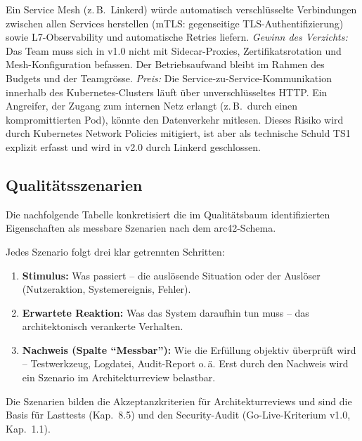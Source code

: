 \begin{description}[leftmargin=0pt, style=nextline]
  \item[Kein Service Mesh in v1.0 (ADR-007):
    $\uparrow$~Betriebseinfachheit,\;$\downarrow$~Security (kein mTLS intern)]
  Ein Service Mesh (z.\,B.\ Linkerd) würde automatisch verschlüsselte
  Verbindungen zwischen allen Services herstellen (mTLS: gegenseitige
  TLS-Authentifizierung) sowie L7-Observability und automatische Retries liefern.
  \textit{Gewinn des Verzichts:} Das Team muss sich in v1.0 nicht mit
  Sidecar-Proxies, Zertifikatsrotation und Mesh-Konfiguration befassen.
  Der Betriebsaufwand bleibt im Rahmen des Budgets und der Teamgrösse.
  \textit{Preis:} Die Service-zu-Service-Kommunikation innerhalb des
  Kubernetes-Clusters läuft über unverschlüsseltes HTTP. Ein Angreifer,
  der Zugang zum internen Netz erlangt (z.\,B.\ durch einen kompromittierten
  Pod), könnte den Datenverkehr mitlesen. Dieses Risiko wird durch
  Kubernetes Network Policies mitigiert, ist aber als technische Schuld
  TS1 explizit erfasst und wird in v2.0 durch Linkerd geschlossen.

\end{description}

\subsection{Qualitätsszenarien}

Die nachfolgende Tabelle konkretisiert die im Qualitätsbaum identifizierten
Eigenschaften als messbare Szenarien nach dem arc42-Schema.

\begin{hinweis}
  Jedes Szenario folgt drei klar getrennten Schritten:
  \begin{enumerate}[leftmargin=2em, topsep=2pt]
  \item \textbf{Stimulus:} Was passiert -- die auslösende Situation oder
  der Auslöser (Nutzeraktion, Systemereignis, Fehler).
  \item \textbf{Erwartete Reaktion:} Was das System daraufhin tun muss --
  das architektonisch verankerte Verhalten.
  \item \textbf{Nachweis (Spalte ``Messbar''):} Wie die Erfüllung
  objektiv überprüft wird -- Testwerkzeug, Logdatei,
  Audit-Report o.\,ä. Erst durch den Nachweis wird ein Szenario
  im Architekturreview belastbar.
  \end{enumerate}
  Die Szenarien bilden die Akzeptanzkriterien für Architekturreviews
  und sind die Basis für Lasttests (Kap.~8.5) und den Security-Audit
  (Go-Live-Kriterium v1.0, Kap.~1.1).
\end{hinweis}

